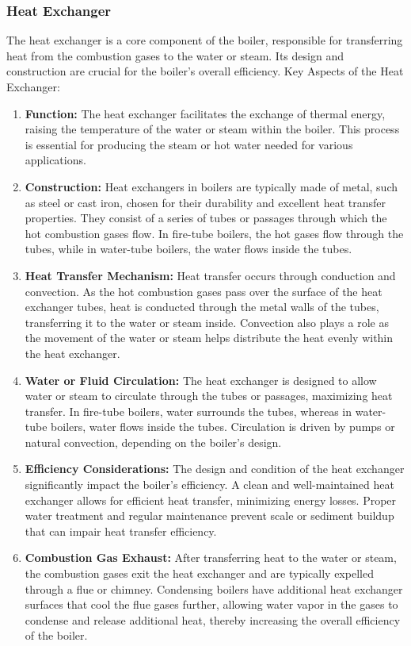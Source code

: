 \subsubsection{Heat Exchanger}
The heat exchanger is a core component of the boiler, responsible for transferring heat from the combustion gases to the water or steam. Its design and construction are crucial for the boiler's overall efficiency.
Key Aspects of the Heat Exchanger:
\begin{enumerate}
    \item \textbf{Function:} The heat exchanger facilitates the exchange of thermal energy, raising the temperature of the water or steam within the boiler. This process is essential for producing the steam or hot water needed for various applications.
    \item \textbf{Construction:} Heat exchangers in boilers are typically made of metal, such as steel or cast iron, chosen for their durability and excellent heat transfer properties. They consist of a series of tubes or passages through which the hot combustion gases flow. In fire-tube boilers, the hot gases flow through the tubes, while in water-tube boilers, the water flows inside the tubes.
    \item \textbf{Heat Transfer Mechanism:} Heat transfer occurs through conduction and convection. As the hot combustion gases pass over the surface of the heat exchanger tubes, heat is conducted through the metal walls of the tubes, transferring it to the water or steam inside. Convection also plays a role as the movement of the water or steam helps distribute the heat evenly within the heat exchanger.
    \item \textbf{Water or Fluid Circulation:} The heat exchanger is designed to allow water or steam to circulate through the tubes or passages, maximizing heat transfer. In fire-tube boilers, water surrounds the tubes, whereas in water-tube boilers, water flows inside the tubes. Circulation is driven by pumps or natural convection, depending on the boiler's design.
    \item \textbf{Efficiency Considerations:} The design and condition of the heat exchanger significantly impact the boiler's efficiency. A clean and well-maintained heat exchanger allows for efficient heat transfer, minimizing energy losses. Proper water treatment and regular maintenance prevent scale or sediment buildup that can impair heat transfer efficiency.
    \item \textbf{Combustion Gas Exhaust:} After transferring heat to the water or steam, the combustion gases exit the heat exchanger and are typically expelled through a flue or chimney. Condensing boilers have additional heat exchanger surfaces that cool the flue gases further, allowing water vapor in the gases to condense and release additional heat, thereby increasing the overall efficiency of the boiler.
\end{enumerate}

